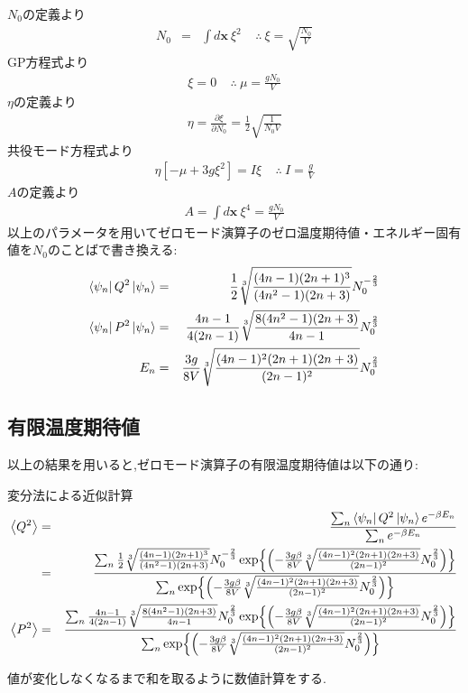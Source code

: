 \documentclass[10.5pt,a4paper]{jreport}
\begin{document}
$N_0$の定義より
\begin{eqnarray}
  N_0 &=& \int d\bm{x}\ \xi^2 \ \ \ \ \ \therefore\ \xi = \sqrt{\frac{N_0}{V}}
\end{eqnarray}
GP方程式より
\begin{eqnarray}
  [-\mu +g\xi^2]\xi = 0\ \ \ \ \ \therefore\ \mu = \frac{gN_0}{V}
\end{eqnarray}
$\eta$の定義より
\begin{eqnarray}
  \eta = \frac{\partial\xi}{\partial N_0} = \frac{1}{2}\sqrt{\frac{1}{N_0V}}
\end{eqnarray}
共役モード方程式より
\begin{eqnarray}
  \eta[-\mu + 3g\xi^2] = I\xi\ \ \ \ \ \therefore\ I = \frac{g}{V}
\end{eqnarray}
$A$の定義より
\begin{eqnarray}
  A = \int d\bm{x}\ \xi^4 = \frac{gN_0}{V}
\end{eqnarray}
以上のパラメータを用いてゼロモード演算子のゼロ温度期待値・エネルギー固有値を$N_0$のことばで書き換える:
\begin{eqnarray}
  \bra{\psi_n}Q^2\ket{\psi_n} &=& \frac{1}{2}{\sqrt[3]{\frac{(4n-1)(2n+1)^3}{(4n^2-1)(2n+3)}}}N_0^{-\frac{2}{3}}\\
  \bra{\psi_n}P^2\ket{\psi_n} &=& \frac{4n-1}{4(2n-1)}{\sqrt[3]{\frac{8(4n^2-1)(2n+3)}{4n-1}}}N_0^{\frac{2}{3}}\\
  E_n &=& \frac{3g}{8V}{\sqrt[3]{\frac{(4n-1)^2(2n+1)(2n+3)}{(2n-1)^2}}}N_0^{\frac{2}{3}}
\end{eqnarray}
\subsection{有限温度期待値}
以上の結果を用いると,ゼロモード演算子の有限温度期待値は以下の通り:
\begin{itembox}[c]{変分法による近似計算}
\begin{eqnarray}
\nonumber  \ev{Q^2} &=& \frac{\sum_n\bra{\psi_n}Q^2\ket{\psi_n}e^{-\beta E_n}}{\sum_ne^{-\beta E_n}}\\
  &=& \frac{\sum_n\frac{1}{2}{\sqrt[3]{\frac{(4n-1)(2n+1)^3}{(4n^2-1)(2n+3)}}}N_0^{-\frac{2}{3}}\exp{\left(-\frac{3g\beta}{8V}{\sqrt[3]{\frac{(4n-1)^2(2n+1)(2n+3)}{(2n-1)^2}}}N_0^{\frac{2}{3}}\right)}}{\sum_n\exp{\left(-\frac{3g\beta}{8V}{\sqrt[3]{\frac{(4n-1)^2(2n+1)(2n+3)}{(2n-1)^2}}}N_0^{\frac{2}{3}}\right)}}\\
  \ev{P^2} &=& \frac{\sum_n\frac{4n-1}{4(2n-1)}{\sqrt[3]{\frac{8(4n^2-1)(2n+3)}{4n-1}}}N_0^{\frac{2}{3}}\exp{\left(-\frac{3g\beta}{8V}{\sqrt[3]{\frac{(4n-1)^2(2n+1)(2n+3)}{(2n-1)^2}}}N_0^{\frac{2}{3}}\right)}}{\sum_n\exp{\left(-\frac{3g\beta}{8V}{\sqrt[3]{\frac{(4n-1)^2(2n+1)(2n+3)}{(2n-1)^2}}}N_0^{\frac{2}{3}}\right)}}
\end{eqnarray}
\end{itembox}
値が変化しなくなるまで和を取るように数値計算をする.
\newpage
\end{document}
